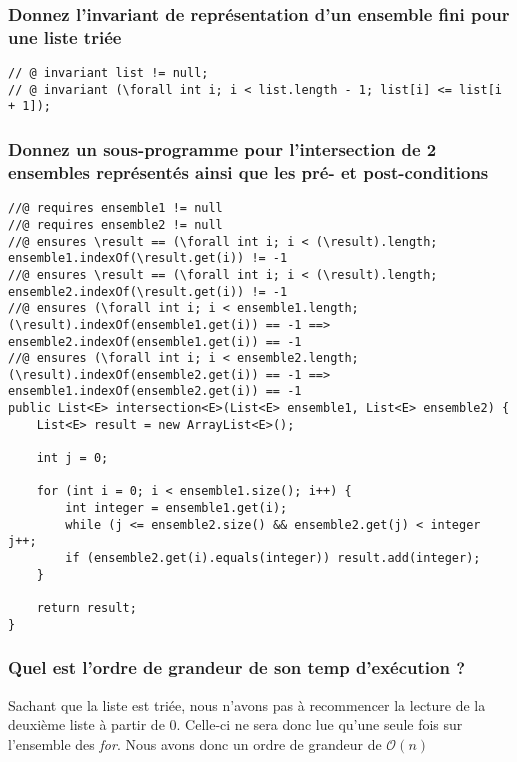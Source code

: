 \documentclass[11pt]{article}
\begin{document}
\subsubsection{Donnez l'invariant de représentation d'un ensemble fini pour une liste triée}

\begin{lstlisting}[]
// @ invariant list != null;
// @ invariant (\forall int i; i < list.length - 1; list[i] <= list[i + 1]);
\end{lstlisting}

\subsubsection{Donnez un sous-programme pour l'intersection de 2 ensembles représentés ainsi que les pré- et post-conditions}

\begin{lstlisting}[]
//@ requires ensemble1 != null
//@ requires ensemble2 != null
//@ ensures \result == (\forall int i; i < (\result).length; ensemble1.indexOf(\result.get(i)) != -1
//@ ensures \result == (\forall int i; i < (\result).length; ensemble2.indexOf(\result.get(i)) != -1
//@ ensures (\forall int i; i < ensemble1.length; (\result).indexOf(ensemble1.get(i)) == -1 ==> ensemble2.indexOf(ensemble1.get(i)) == -1
//@ ensures (\forall int i; i < ensemble2.length; (\result).indexOf(ensemble2.get(i)) == -1 ==> ensemble1.indexOf(ensemble2.get(i)) == -1
public List<E> intersection<E>(List<E> ensemble1, List<E> ensemble2) {
	List<E> result = new ArrayList<E>();
	
	int j = 0;
	
	for (int i = 0; i < ensemble1.size(); i++) {
		int integer = ensemble1.get(i);
		while (j <= ensemble2.size() && ensemble2.get(j) < integer j++;
		if (ensemble2.get(i).equals(integer)) result.add(integer);
	}
	
	return result;
}
\end{lstlisting}

\subsubsection{Quel est l'ordre de grandeur de son temp d'exécution ?}

Sachant que la liste est triée, nous n'avons pas à recommencer la lecture de la deuxième liste à partir de 0. Celle-ci ne sera donc lue qu'une seule fois sur l'ensemble des \emph{for}. Nous avons donc un ordre de grandeur de $\mathcal{O}(n)$ 
\end{document}
